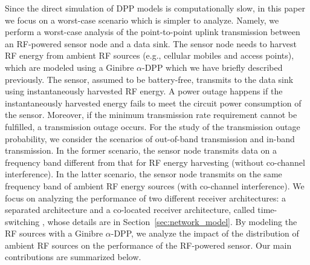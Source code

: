 \documentclass[12pt,draftclsnofoot,onecolumn]{IEEEtran}
\begin{document}
 

Since the direct simulation of DPP models is computationally slow, in this paper we focus on a worst-case scenario which is simpler to analyze. 
Namely, we perform a worst-case analysis of the point-to-point uplink transmission between an RF-powered sensor node and a data sink. The sensor node needs to harvest RF energy from ambient RF sources (e.g., cellular mobiles and access points), which are modeled using a Ginibre $\alpha$-DPP which we have briefly described previously. The sensor, assumed to be battery-free, transmits to the data sink using instantaneously harvested RF energy. A power outage happens if the instantaneously harvested energy fails to meet the circuit power consumption of the sensor. Moreover, if the minimum transmission rate requirement cannot be fulfilled, a transmission outage occurs. For the study of the transmission outage probability, we consider the scenarios of out-of-band transmission and in-band transmission.
In the former scenario, the sensor node transmits data on a  frequency band different from that for RF energy harvesting (without co-channel interference). In the latter scenario, the sensor node transmits on the same frequency band of ambient RF energy sources (with co-channel interference). 
We focus on analyzing the performance of two different receiver architectures: a separated architecture \cite{X.2014Lu} and a co-located receiver architecture, called time-switching \cite{ZhangRuiMIMO}, whose details are in Section~\ref{sec:network_model}. By modeling the RF sources with a Ginibre $\alpha$-DPP, we analyze the impact of the distribution of ambient RF sources on the performance of the RF-powered sensor. Our main contributions are summarized below.
\end{document}
